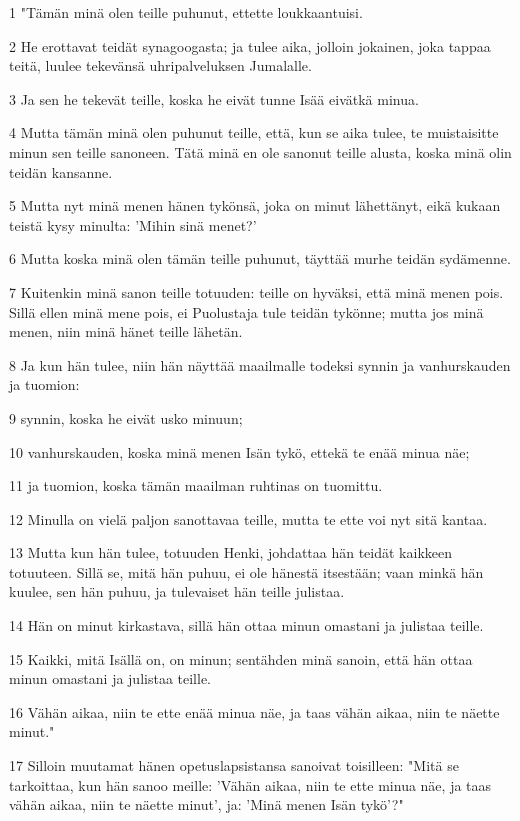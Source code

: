 \par 1 "Tämän minä olen teille puhunut, ettette loukkaantuisi.
\par 2 He erottavat teidät synagoogasta; ja tulee aika, jolloin jokainen, joka tappaa teitä, luulee tekevänsä uhripalveluksen Jumalalle.
\par 3 Ja sen he tekevät teille, koska he eivät tunne Isää eivätkä minua.
\par 4 Mutta tämän minä olen puhunut teille, että, kun se aika tulee, te muistaisitte minun sen teille sanoneen. Tätä minä en ole sanonut teille alusta, koska minä olin teidän kansanne.
\par 5 Mutta nyt minä menen hänen tykönsä, joka on minut lähettänyt, eikä kukaan teistä kysy minulta: 'Mihin sinä menet?'
\par 6 Mutta koska minä olen tämän teille puhunut, täyttää murhe teidän sydämenne.
\par 7 Kuitenkin minä sanon teille totuuden: teille on hyväksi, että minä menen pois. Sillä ellen minä mene pois, ei Puolustaja tule teidän tykönne; mutta jos minä menen, niin minä hänet teille lähetän.
\par 8 Ja kun hän tulee, niin hän näyttää maailmalle todeksi synnin ja vanhurskauden ja tuomion:
\par 9 synnin, koska he eivät usko minuun;
\par 10 vanhurskauden, koska minä menen Isän tykö, ettekä te enää minua näe;
\par 11 ja tuomion, koska tämän maailman ruhtinas on tuomittu.
\par 12 Minulla on vielä paljon sanottavaa teille, mutta te ette voi nyt sitä kantaa.
\par 13 Mutta kun hän tulee, totuuden Henki, johdattaa hän teidät kaikkeen totuuteen. Sillä se, mitä hän puhuu, ei ole hänestä itsestään; vaan minkä hän kuulee, sen hän puhuu, ja tulevaiset hän teille julistaa.
\par 14 Hän on minut kirkastava, sillä hän ottaa minun omastani ja julistaa teille.
\par 15 Kaikki, mitä Isällä on, on minun; sentähden minä sanoin, että hän ottaa minun omastani ja julistaa teille.
\par 16 Vähän aikaa, niin te ette enää minua näe, ja taas vähän aikaa, niin te näette minut."
\par 17 Silloin muutamat hänen opetuslapsistansa sanoivat toisilleen: "Mitä se tarkoittaa, kun hän sanoo meille: 'Vähän aikaa, niin te ette minua näe, ja taas vähän aikaa, niin te näette minut', ja: 'Minä menen Isän tykö'?"
